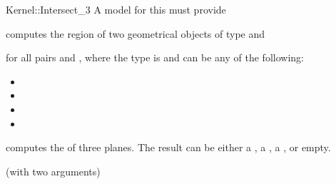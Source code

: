 \begin{ccRefFunctionObjectConcept}{Kernel::Intersect_3}
A model for this must provide


{computes the  region of two geometrical objects of type 
 and }

for all pairs  and , where
the type  is  and 
 can be any of the following:
\begin{itemize}
\item {}
\item {}
\item {}
\item {}
\end{itemize}

{computes the  of three planes.  The result
can be either a , a , a
, or empty.}

\ccRefines
{} (with two arguments)

\ccSeeAlso
{}\\

\end{ccRefFunctionObjectConcept}
